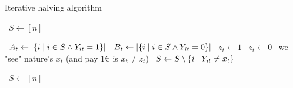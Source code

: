 \begin{algorithm}
    \caption{Iterative halving algorithm}\label{alg:iter_halving}
    \begin{algorithmic}%
            \State~$S \gets [n]$

                \State~$A_t \gets \vert  \{ i \; \vert \; i \in S \wedge Y_{it} = 1 \}  \vert$
                \State~$B_t \gets \vert  \{ i \; \vert \; i \in S \wedge Y_{it} = 0 \}  \vert$
                    \State~$z_t \gets 1$
                \Else
                    \State~$z_t \gets 0$
                \EndIf
                \State~we "see" nature's $x_t$ (and pay $1$€ is $x_t \neq z_t$)
                \State~$S \gets S \setminus \{ i \; \vert \; Y_{it} \neq x_t \}$

                    \State~$S \gets [n]$
                \EndIf
            \EndFor
    \end{algorithmic}
\end{algorithm}